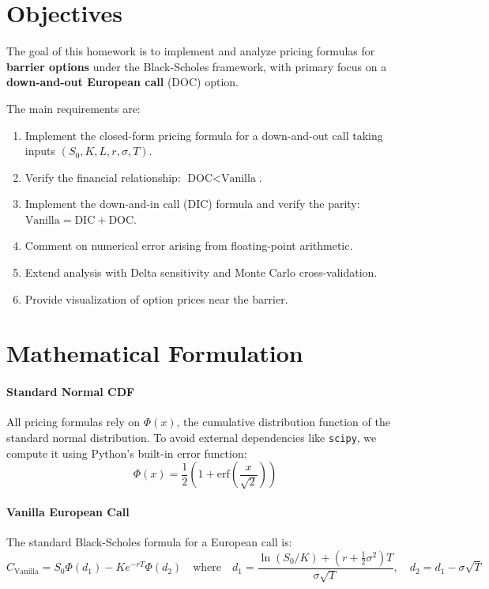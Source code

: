 \documentclass{report}
\begin{document}
\section{Objectives}

The goal of this homework is to implement and analyze pricing formulas for \textbf{barrier options} under the Black-Scholes framework, with primary focus on a \textbf{down-and-out European call} (DOC) option.

The main requirements are:
\begin{enumerate}
    \item Implement the closed-form pricing formula for a down-and-out call taking inputs $(S_0, K, L, r, \sigma, T)$.
    \item Verify the financial relationship: $\text{DOC} < \text{Vanilla}$.
    \item Implement the down-and-in call (DIC) formula and verify the parity: $\text{Vanilla} = \text{DIC} + \text{DOC}$.
    \item Comment on numerical error arising from floating-point arithmetic.
    \item Extend analysis with Delta sensitivity and Monte Carlo cross-validation.
    \item Provide visualization of option prices near the barrier.
\end{enumerate}

\section{Mathematical Formulation}

\paragraph{Standard Normal CDF}
All pricing formulas rely on $\Phi(x)$, the cumulative distribution function of the standard normal distribution. To avoid external dependencies like \texttt{scipy}, we compute it using Python's built-in error function:
$$\Phi(x) = \frac{1}{2}\left(1 + \text{erf}\left(\frac{x}{\sqrt{2}}\right)\right)$$

\paragraph{Vanilla European Call}
The standard Black-Scholes formula for a European call is:
$$C_{\text{Vanilla}} = S_0 \Phi(d_1) - K e^{-rT} \Phi(d_2) \quad
\text{where} \quad d_1 = \frac{\ln(S_0/K) + (r + \frac{1}{2}\sigma^2)T}{\sigma\sqrt{T}}, \quad d_2 = d_1 - \sigma\sqrt{T}$$
\end{document}
